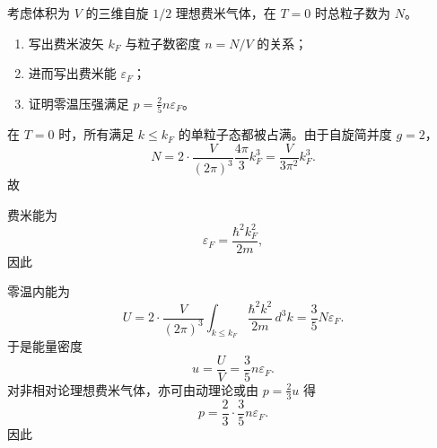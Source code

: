 \begin{question}
考虑体积为 $V$ 的三维自旋 $1/2$ 理想费米气体，在 $T=0$ 时总粒子数为 $N$。

\begin{enumerate}[label=(\arabic*),leftmargin=2.5em]
  \item 写出费米波矢 $k_F$ 与粒子数密度 $n=N/V$ 的关系；
  \item 进而写出费米能 $\varepsilon_F$；
  \item 证明零温压强满足 $p=\frac{2}{5}n\varepsilon_F$。
\end{enumerate}

\begin{solution}
在 $T=0$ 时，所有满足 $k\le k_F$ 的单粒子态都被占满。由于自旋简并度 $g=2$，
\[
N=2\cdot \frac{V}{(2\pi)^3}\frac{4\pi}{3}k_F^3
=\frac{V}{3\pi^2}k_F^3.
\]
故

费米能为
\[
\varepsilon_F=\frac{\hbar^2 k_F^2}{2m},
\]
因此

零温内能为
\[
U=2\cdot \frac{V}{(2\pi)^3}\int_{k\le k_F}\frac{\hbar^2 k^2}{2m}\,d^3k
=\frac{3}{5}N\varepsilon_F.
\]
于是能量密度
\[
u=\frac{U}{V}=\frac{3}{5}n\varepsilon_F.
\]
对非相对论理想费米气体，亦可由动理论或由 $p=\frac{2}{3}u$ 得
\[
p=\frac{2}{3}\cdot \frac{3}{5}n\varepsilon_F.
\]
因此
\end{solution}
\end{question}

